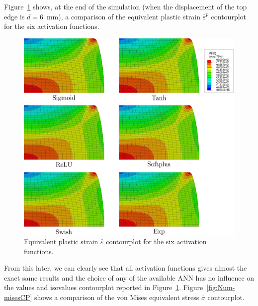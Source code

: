 \documentclass[algorithms,article,submit,pdftex,oneauthors]{Definitions/mdpi}
\begin{document}
Figure~\ref{fig:Num-peeqCP} shows, at the end of the simulation (when the displacement of the top edge is $d=6$~mm), a comparison of the equivalent plastic strain $\overline{\varepsilon}^p$ contourplot for the six activation functions.
\begin{figure}[h!]
\centering
\includegraphics[width=0.9\columnwidth]{Figures/PeeqHalf}
\caption{Equivalent plastic strain $\overline{\varepsilon}$ contourplot for the six activation functions.}
\label{fig:Num-peeqCP}
\end{figure}
From this later, we can clearly see that all activation functions gives almost the exact same results and the choice of any of the available ANN has no influence on the values and isovalues contourplot reported in Figure~\ref{fig:Num-peeqCP}.
Figure~\ref{fig:Num-misesCP} shows a comparison of the von Mises equivalent stress $\overline{\sigma}$ contourplot.
\end{document}
